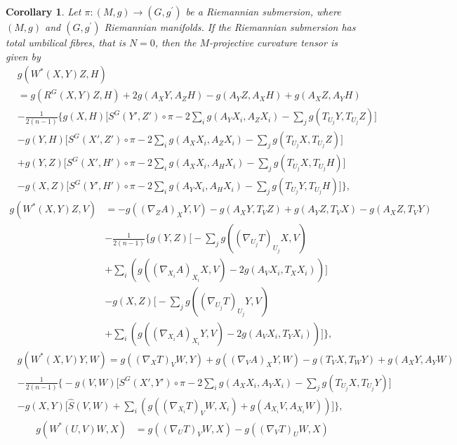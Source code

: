 \documentclass{birkjour}
\newtheorem{corollary}[theorem]{Corollary}
\theoremstyle{definition}
\theoremstyle{remark}
\numberwithin{equation}{section}
\begin{document}
\begin{corollary}
Let $\pi: (M, g) \to(G, g^\prime)$ be a Riemannian submersion, where $(M, g)$ and $(G, g^\prime)$ Riemannian manifolds. If the Riemannian submersion has total umbilical fibres, that  is $N = 0$, then the $M$-projective curvature tensor is given by
	\begin{align*}
		&g(W^* (X,Y)Z, H)\\
		&= g(R^G (X,Y)Z, H) +2 g (A_X Y, A_Z H) - g(A_Y Z, A_X H) + g(A_X Z, A_Y H) \\
		&- \frac{1}{2(n-1)} \Bigg\{g(X, H) \bigg[S^G (Y',Z') \circ \pi
		- 2 \sum_{i} g(A_Y X_i, A_Z X_i) - \sum_{j} g(T_{U_j}Y, T_{U_j}Z) \bigg] \\
		&-g(Y,H) \bigg[S^G (X',Z') \circ \pi
		-2 \sum_{i} g(A_X X_i, A_Z X_i)- \sum_{j}g(T_{U_j}X, T_{U_j}Z)  \bigg] \\
		&+g(Y,Z) \bigg[S^G (X',H') \circ \pi
		-2 \sum_{i} g(A_X X_i, A_H X_i)- \sum_{j}g(T_{U_j}X, T_{U_j}H)  \bigg] \\
		&-g(X,Z) \bigg[S^G (Y',H') \circ \pi
		-2 \sum_{i} g(A_Y X_i, A_H X_i)- \sum_{j}g(T_{U_j}Y, T_{U_j}H)  \bigg]\Bigg\},
	\end{align*}
	\begin{align*}
		g(W^* (X,Y)Z, V) &=-g((\nabla_Z A)_X Y,V) - g(A_X Y, T_V Z) + g(A_Y Z, T_V X)- g(A_X Z, T_V Y) \\
		&- \frac{1}{2(n-1)} \Bigg\{g(Y, Z) \bigg[
		-\sum_{j} g((\nabla_{U_j} T)_{U_j} X, V) \\
		&+\sum_{i}\left(g((\nabla_{X_i}A)_{X_i} X,V )- 2 g (A_V X_i, T_X X_i) \right) \bigg] \\
		&  -g(X,Z) \bigg[
		-\sum_{j} g((\nabla_{U_j} T)_{U_j} Y, V) \\
		&+ \sum_{i}\left(g((\nabla_{X_i}A)_{X_i} Y,V  ) - 2 g (A_V X_i, T_Y X_i) \right) \bigg] \Bigg\},
	\end{align*}
	\begin{align*}
		&g(W^* (X,V)Y ,W)\!=\!g((\nabla_X T)_V W, Y)\!+\!g((\nabla_V A)_X Y,W)\!-\! g(T_V X, T_W Y)\!+\!g(A_X Y, A_Y W)\\
		&-\frac{1}{2(n-1)} \bigg\{ - g(V,W) \Big[ S^G (X', Y') \circ \pi
		- 2 \sum_{i} g(A_X X_i, A_Y X_i) -\sum_{j} g(T_{U_j}X, T_{U_j}Y) \Big]\\
		& - g(X,Y) \Big[\hat{S} (V,W) + \sum_{i}\left(g((\nabla_{X_i}T)_V W,X_i)
		+ g(A_{X_i} V, A_{X_i}W)  \right) \Big] \bigg\},
	\end{align*}
	\begin{align*}
		g(W^* (U,V)W ,X)&=g((\nabla_U T)_V W, X) - g((\nabla_V T)_U W, X)\\

\end{align*}
\end{corollary}
\end{document}
